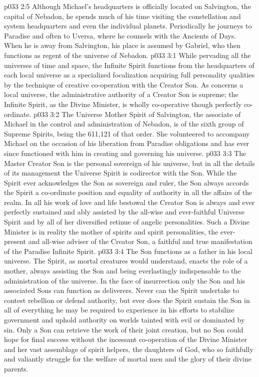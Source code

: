 \pc \vs p033 2:5 Although Michael’s headquarters is officially located on Salvington, the capital of Nebadon, he spends much of his time visiting the constellation and system headquarters and even the individual planets. Periodically he journeys to Paradise and often to Uversa, where he counsels with the Ancients of Days. When he is away from Salvington, his place is assumed by Gabriel, who then functions as regent of the universe of Nebadon.
\vs p033 3:1 While pervading all the universes of time and space, the Infinite Spirit functions from the headquarters of each local universe as a specialized focalization acquiring full personality qualities by the technique of creative co\hyp{}operation with the Creator Son. As concerns a local universe, the administrative authority of a Creator Son is supreme; the Infinite Spirit, as the Divine Minister, is wholly co\hyp{}operative though perfectly co\hyp{}ordinate.
\pc \vs p033 3:2 The Universe Mother Spirit of Salvington, the associate of Michael in the control and administration of Nebadon, is of the sixth group of Supreme Spirits, being the 611,121 of that order. She volunteered to accompany Michael on the occasion of his liberation from Paradise obligations and has ever since functioned with him in creating and governing his universe.
\pc \vs p033 3:3 The Master Creator Son is the personal sovereign of his universe, but in all the details of its management the Universe Spirit is codirector with the Son. While the Spirit ever acknowledges the Son as sovereign and ruler, the Son always accords the Spirit a co\hyp{}ordinate position and equality of authority in all the affairs of the realm. In all his work of love and life bestowal the Creator Son is always and ever perfectly sustained and ably assisted by the all\hyp{}wise and ever\hyp{}faithful Universe Spirit and by all of her diversified retinue of angelic personalities. Such a Divine Minister is in reality the mother of spirits and spirit personalities, the ever\hyp{}present and all\hyp{}wise adviser of the Creator Son, a faithful and true manifestation of the Paradise Infinite Spirit.
\pc \vs p033 3:4 The Son functions as a father in his local universe. The Spirit, as mortal creatures would understand, enacts the role of a mother, always assisting the Son and being everlastingly indispensable to the administration of the universe. In the face of insurrection only the Son and his associated Sons can function as deliverers. Never can the Spirit undertake to contest rebellion or defend authority, but ever does the Spirit sustain the Son in all of everything he may be required to experience in his efforts to stabilize government and uphold authority on worlds tainted with evil or dominated by sin. Only a Son can retrieve the work of their joint creation, but no Son could hope for final success without the incessant co\hyp{}operation of the Divine Minister and her vast assemblage of spirit helpers, the daughters of God, who so faithfully and valiantly struggle for the welfare of mortal men and the glory of their divine parents.
